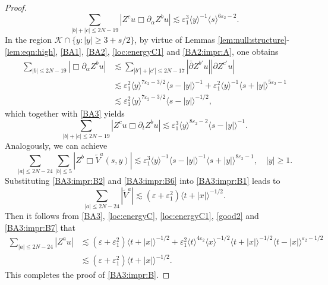 \documentclass[11pt,twoside]{article}
\def\cK{\mathcal K}
\def\p{\partial}
\def\ve{\varepsilon}
\def\ls{\lesssim}
\newcommand{\w}[1]{\langle {#1} \rangle}
\theoremstyle{plain}
\theoremstyle{definition}
\numberwithin{equation}{section}
\begin{document}
\begin{proof}
\begin{equation}\label{BA3:impr:B4}
\sum_{|b|+|c|\le2N-19}|Z^cu\Box\p_{\alpha}Z^bu|\ls\ve_1^3\w{y}^{-1}\w{s}^{6\ve_2-2}.
\end{equation}
In the region $\cK\cap\{y:|y|\ge3+s/2\}$, by virtue of Lemmas \ref{lem:null:structure}-\ref{lem:eqn:high}, \eqref{BA1},
\eqref{BA2}, \eqref{loc:energyC1} and \eqref{BA2:impr:A}, one obtains
\begin{equation*}
\begin{split}
\sum_{|b|\le2N-19}|\Box\p_{\alpha}Z^bu|&\ls\sum_{|b'|+|c'|\le2N-17}|\bar\p Z^{b'}u||\p Z^{c'}u|\\
&\ls\ve_1^2\w{y}^{7\ve_2-3/2}\w{s-|y|}^{-1}+\ve_1^2\w{y}^{-1}\w{s+|y|}^{5\ve_2-1}\\
&\ls\ve_1^2\w{y}^{7\ve_2-3/2}\w{s-|y|}^{-1/2},
\end{split}
\end{equation*}
which together with \eqref{BA3} yields
\begin{equation}\label{BA3:impr:B5}
\sum_{|b|+|c|\le2N-19}|Z^cu\Box\p_tZ^bu|\ls\ve_1^3\w{y}^{8\ve_2-2}\w{s-|y|}^{-1}.
\end{equation}
Analogously, we can achieve
\begin{equation}\label{BA3:impr:B6}
\sum_{|a|\le2N-24}\sum_{|b|\le5}|Z^b\Box \tilde V^a(s,y)|\ls\ve_1^3\w{y}^{-1}\w{s-|y|}^{-1}\w{s+|y|}^{8\ve_2-1},\quad |y|\ge1.
\end{equation}
Substituting \eqref{BA3:impr:B2} and \eqref{BA3:impr:B6} into \eqref{BA3:impr:B1} leads to
\begin{equation}\label{BA3:impr:B7}
\sum_{|a|\le2N-24}|\tilde V^a|\ls(\ve+\ve_1^2)\w{t+|x|}^{-1/2}.
\end{equation}
Then it follows from \eqref{BA3}, \eqref{loc:energyC}, \eqref{loc:energyC1}, \eqref{good2} and \eqref{BA3:impr:B7} that
\begin{equation*}
\begin{split}
\sum_{|a|\le2N-24}|Z^au|&\ls(\ve+\ve_1^2)\w{t+|x|}^{-1/2}+\ve_1^2\w{t}^{4\ve_2}\w{x}^{-1/2}\w{t+|x|}^{-1/2}\w{t-|x|}^{\ve_2-1/2}\\
&\ls(\ve+\ve_1^2)\w{t+|x|}^{-1/2}.
\end{split}
\end{equation*}
This completes the proof of \eqref{BA3:impr:B}.
\end{proof}
\end{document}
